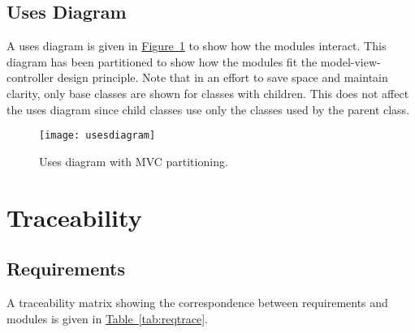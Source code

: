 \documentclass[12pt, titlepage]{article}
\begin{document}
\subsection{Uses Diagram}
A uses diagram is given in \hyperref[fig:usesdiagram]{Figure~\ref*{fig:usesdiagram}} to show how the modules interact.  This diagram has been partitioned to show how the modules fit the model-view-controller design principle.  Note that in an effort to save space and maintain clarity, only base classes are shown for classes with children.  This does not affect the uses diagram since child classes use only the classes used by the parent class.
\begin{figure}[hTB]
\begin{center}
\texttt{[image: usesdiagram]}
\caption{Uses diagram with MVC partitioning.} \label{fig:usesdiagram}
\end{center}
\end{figure}

\section{Traceability}
\subsection{Requirements}
A traceability matrix showing the correspondence between requirements and modules is given in \hyperref[tab:reqtrace]{Table~\ref*{tab:reqtrace}}.
\end{document}
